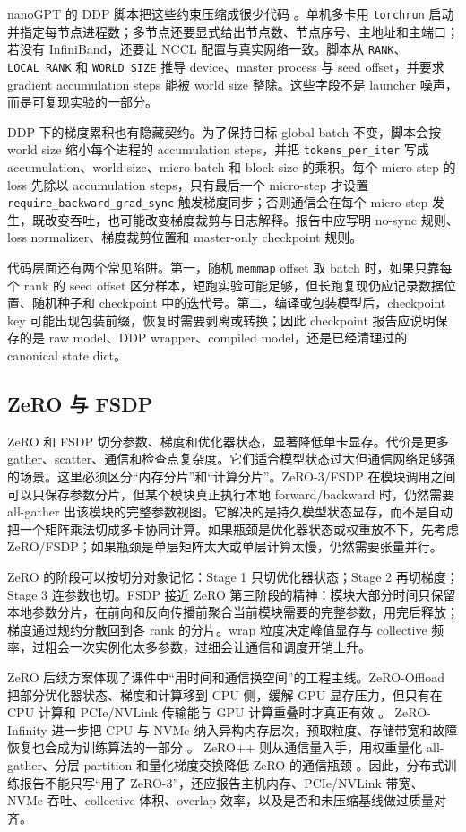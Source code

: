 \documentclass[UTF8,zihao=-4,openany]{ctexbook}
\begin{document}
nanoGPT 的 DDP 脚本把这些约束压缩成很少代码 \cite{karpathy2022nanogpt}。单机多卡用 \texttt{torchrun} 启动并指定每节点进程数；多节点还要显式给出节点数、节点序号、主地址和主端口；若没有 InfiniBand，还要让 NCCL 配置与真实网络一致。脚本从 \texttt{RANK}、\texttt{LOCAL\_RANK} 和 \texttt{WORLD\_SIZE} 推导 device、master process 与 seed offset，并要求 gradient accumulation steps 能被 world size 整除。这些字段不是 launcher 噪声，而是可复现实验的一部分。

DDP 下的梯度累积也有隐藏契约。为了保持目标 global batch 不变，脚本会按 world size 缩小每个进程的 accumulation steps，并把 \texttt{tokens\_per\_iter} 写成 accumulation、world size、micro-batch 和 block size 的乘积。每个 micro-step 的 loss 先除以 accumulation steps，只有最后一个 micro-step 才设置 \texttt{require\_backward\_grad\_sync} 触发梯度同步；否则通信会在每个 micro-step 发生，既改变吞吐，也可能改变梯度裁剪与日志解释。报告中应写明 no-sync 规则、loss normalizer、梯度裁剪位置和 master-only checkpoint 规则。

代码层面还有两个常见陷阱。第一，随机 \texttt{memmap} offset 取 batch 时，如果只靠每个 rank 的 seed offset 区分样本，短跑实验可能足够，但长跑复现仍应记录数据位置、随机种子和 checkpoint 中的迭代号。第二，编译或包装模型后，checkpoint key 可能出现包装前缀，恢复时需要剥离或转换；因此 checkpoint 报告应说明保存的是 raw model、DDP wrapper、compiled model，还是已经清理过的 canonical state dict。

\subsection{ZeRO 与 FSDP}
ZeRO 和 FSDP 切分参数、梯度和优化器状态，显著降低单卡显存。代价是更多 gather、scatter、通信和检查点复杂度。它们适合模型状态过大但通信网络足够强的场景。这里必须区分“内存分片”和“计算分片”。ZeRO-3/FSDP 在模块调用之间可以只保存参数分片，但某个模块真正执行本地 forward/backward 时，仍然需要 all-gather 出该模块的完整参数视图。它解决的是持久模型状态显存，而不是自动把一个矩阵乘法切成多卡协同计算。如果瓶颈是优化器状态或权重放不下，先考虑 ZeRO/FSDP；如果瓶颈是单层矩阵太大或单层计算太慢，仍然需要张量并行。

ZeRO 的阶段可以按切分对象记忆：Stage 1 只切优化器状态；Stage 2 再切梯度；Stage 3 连参数也切。FSDP 接近 ZeRO 第三阶段的精神：模块大部分时间只保留本地参数分片，在前向和反向传播前聚合当前模块需要的完整参数，用完后释放；梯度通过规约分散回到各 rank 的分片。wrap 粒度决定峰值显存与 collective 频率，过粗会一次实例化太多参数，过细会让通信和调度开销上升。

ZeRO 后续方案体现了课件中“用时间和通信换空间”的工程主线。ZeRO-Offload 把部分优化器状态、梯度和计算移到 CPU 侧，缓解 GPU 显存压力，但只有在 CPU 计算和 PCIe/NVLink 传输能与 GPU 计算重叠时才真正有效 \cite{ren2021zerooffload}。 ZeRO-Infinity 进一步把 CPU 与 NVMe 纳入异构内存层次，预取粒度、存储带宽和故障恢复也会成为训练算法的一部分 \cite{rajbhandari2021zeroinfinity}。 ZeRO++ 则从通信量入手，用权重量化 all-gather、分层 partition 和量化梯度交换降低 ZeRO 的通信瓶颈 \cite{wang2023zeropp}。因此，分布式训练报告不能只写“用了 ZeRO-3”，还应报告主机内存、PCIe/NVLink 带宽、NVMe 吞吐、collective 体积、overlap 效率，以及是否和未压缩基线做过质量对齐。
\end{document}
